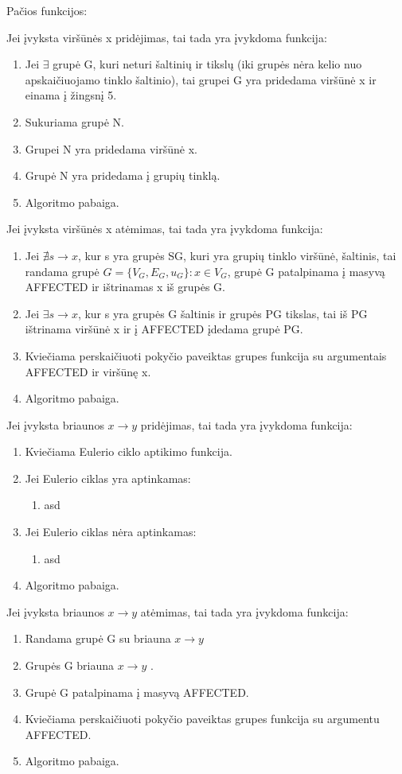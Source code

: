 Pačios funkcijos:

Jei įvyksta viršūnės x pridėjimas, tai tada yra įvykdoma funkcija:
\begin{enumerate}
	\item Jei $\exists$ grupė G, kuri neturi šaltinių ir tikslų (iki grupės nėra kelio nuo apskaičiuojamo tinklo šaltinio), tai grupei G yra pridedama viršūnė x ir einama į žingsnį 5.
	\item Sukuriama grupė N.
	\item Grupei N  yra pridedama viršūnė x.
	\item Grupė N  yra pridedama į grupių tinklą.
	\item Algoritmo pabaiga. 
\end{enumerate}

Jei įvyksta viršūnės x atėmimas, tai tada yra įvykdoma funkcija:
\begin{enumerate}
\item Jei $\nexists s \rightarrow x$, kur s yra grupės SG, kuri yra grupių tinklo viršūnė, šaltinis, tai randama grupė $G=\{V_G, E_G, u_G\} : x \in V_G$, grupė G patalpinama į masyvą AFFECTED ir ištrinamas x iš grupės G.
\item Jei $\exists s \rightarrow x$, kur s yra grupės G šaltinis ir grupės PG tikslas, tai iš PG ištrinama viršūnė x ir  į AFFECTED įdedama grupė PG.
\item Kviečiama perskaičiuoti pokyčio paveiktas grupes funkcija su argumentais AFFECTED ir viršūnę x.
\item Algoritmo pabaiga. 
\end{enumerate}

Jei įvyksta briaunos $x \rightarrow y$ pridėjimas, tai tada yra įvykdoma funkcija:
\begin{enumerate}
	\item Kviečiama Eulerio ciklo aptikimo funkcija. 
	\item Jei Eulerio ciklas yra aptinkamas:
		\begin{enumerate}
			\item asd
		\end{enumerate} 
	\item Jei Eulerio ciklas nėra aptinkamas:
\begin{enumerate}
\item asd
\end{enumerate} 
	\item Algoritmo pabaiga. 
\end{enumerate}

Jei įvyksta briaunos $x \rightarrow y$ atėmimas, tai tada yra įvykdoma funkcija:
\begin{enumerate}
\item Randama grupė G su briauna $x \rightarrow y$
\item Grupės G briauna $x \rightarrow y$ .
\item  Grupė G patalpinama į masyvą AFFECTED.
\item Kviečiama perskaičiuoti pokyčio paveiktas grupes funkcija su argumentu AFFECTED.
\item Algoritmo pabaiga. 
\end{enumerate}

